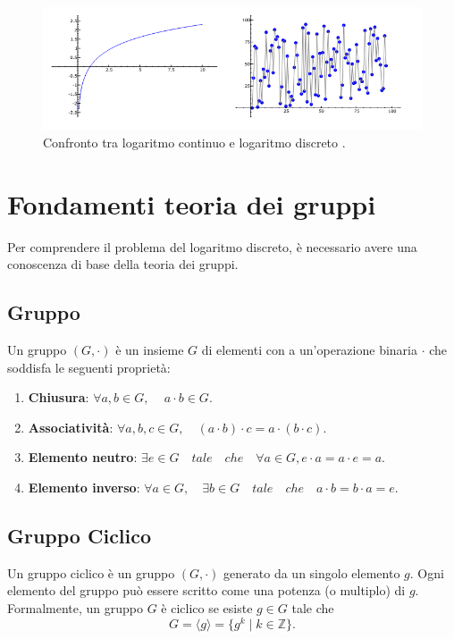 \documentclass[a4paper,12pt]{report}
\begin{document}
\begin{figure}[ht]
    \centering
    \includegraphics[width=1.0\textwidth]{img/logarithms.png}
    \caption{Confronto tra logaritmo continuo e logaritmo discreto \cite{stein2008}.}
    \label{fig:logarithms}
\end{figure}

\section{Fondamenti teoria dei gruppi}
Per comprendere il problema del logaritmo discreto, è necessario avere una conoscenza di base della teoria dei gruppi.

\subsection*{Gruppo}

Un gruppo \( (G, \cdot) \) è un insieme \( G \) di elementi con a un'operazione binaria \( \cdot \) che soddisfa le seguenti proprietà:

\begin{enumerate}
    \item \textbf{Chiusura}: \(\forall a, b \in G, \, \quad a \cdot b \in G.\)
    \item \textbf{Associatività}: \(\forall a, b, c \in G, \quad (a \cdot b) \cdot c = a \cdot (b \cdot c).\)
    \item \textbf{Elemento neutro}: \(\exists e \in G \quad tale \quad che \quad \forall a \in G, e \cdot a = a \cdot e = a.\)
    \item \textbf{Elemento inverso}: \(\forall a \in G, \quad \exists b \in G \quad tale \quad che \quad a \cdot b = b \cdot a = e.\)
\end{enumerate}

\subsection*{Gruppo Ciclico}

Un gruppo ciclico è un gruppo \( (G, \cdot) \) generato da un singolo elemento \( g \). Ogni elemento del gruppo può essere scritto come una potenza (o multiplo) di \( g \). Formalmente, un gruppo \( G \) è ciclico se esiste \( g \in G \) tale che
\[G = \langle g \rangle = \{ g^k \mid k \in \mathbb{Z} \}.\]
\end{document}
